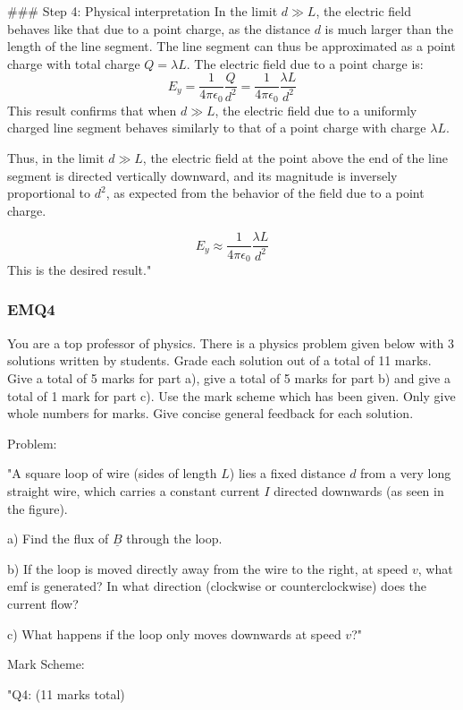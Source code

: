 ### Step 4: Physical interpretation
In the limit \( d \gg L \), the electric field behaves like that due to a point charge, as the distance \( d \) is much larger than the length of the line segment. The line segment can thus be approximated as a point charge with total charge \( Q = \lambda L \). The electric field due to a point charge is:
\[
E_y = \frac{1}{4 \pi \epsilon_0} \frac{Q}{d^2} = \frac{1}{4 \pi \epsilon_0} \frac{\lambda L}{d^2}
\]
This result confirms that when \( d \gg L \), the electric field due to a uniformly charged line segment behaves similarly to that of a point charge with charge \( \lambda L \).

Thus, in the limit \( d \gg L \), the electric field at the point above the end of the line segment is directed vertically downward, and its magnitude is inversely proportional to \( d^2 \), as expected from the behavior of the field due to a point charge.

\[
E_y \approx \frac{1}{4 \pi \epsilon_0} \frac{\lambda L}{d^2}
\]
This is the desired result."


\subsubsection{EMQ4}

You are a top professor of physics. There is a physics problem given below with 3 solutions written by students. Grade each solution out of a total of 11 marks. Give a total of 5 marks for part a), give a total of 5 marks for part b) and give a total of 1 mark for part c). Use the mark scheme which has been given. Only give whole numbers for marks. Give concise general feedback for each solution. 

Problem:

"A square loop of wire (sides of length \( L \)) lies a fixed distance \( d \) from a very long straight wire, which carries a constant current \( I \) directed downwards (as seen in the figure).

a) Find the flux of \( \underline{B} \) through the loop.

b) If the loop is moved directly away from the wire to the right, at speed \( v \), what emf is generated? In what direction (clockwise or counterclockwise) does the current flow?

c) What happens if the loop only moves downwards at speed \( v \)?"

Mark Scheme:

"{Q4: (11 marks total)}

